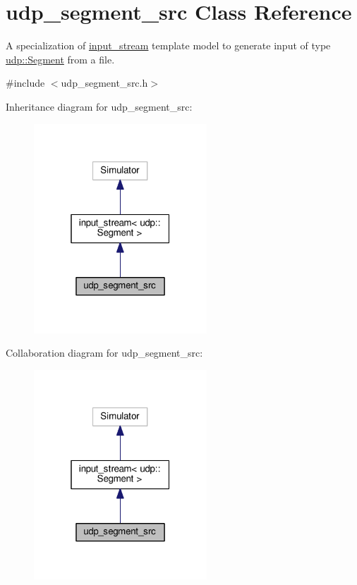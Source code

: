 \hypertarget{classudp__segment__src}{}\section{udp\+\_\+segment\+\_\+src Class Reference}
\label{classudp__segment__src}


A specialization of \hyperlink{classinput__stream}{input\+\_\+stream} template model to generate input of type \hyperlink{structudp_1_1Segment}{udp\+::\+Segment} from a file.  




{\ttfamily \#include $<$udp\+\_\+segment\+\_\+src.\+h$>$}



Inheritance diagram for udp\+\_\+segment\+\_\+src\+:\nopagebreak
\begin{figure}[H]
\begin{center}
\leavevmode
\includegraphics[width=184pt]{classudp__segment__src__inherit__graph}
\end{center}
\end{figure}


Collaboration diagram for udp\+\_\+segment\+\_\+src\+:\nopagebreak
\begin{figure}[H]
\begin{center}
\leavevmode
\includegraphics[width=184pt]{classudp__segment__src__coll__graph}
\end{center}
\end{figure}
